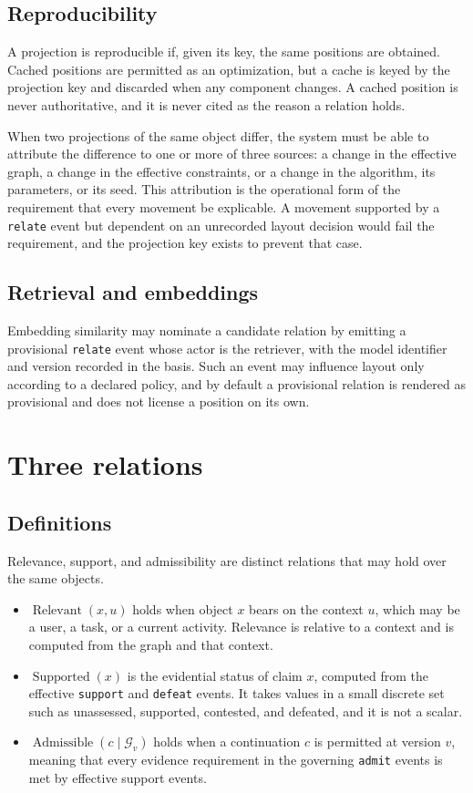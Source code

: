 \documentclass[11pt]{article}
\theoremstyle{definition}
\newcommand{\Graph}{\mathcal{G}}
\newcommand{\Rel}{\operatorname{Relevant}}
\newcommand{\Supp}{\operatorname{Supported}}
\newcommand{\Adm}{\operatorname{Admissible}}
\newcommand{\ev}[1]{\texttt{#1}}
\begin{document}
\subsection{Reproducibility}

A projection is reproducible if, given its key, the same positions are obtained. Cached positions are permitted as an optimization, but a cache is keyed by the projection key and discarded when any component changes. A cached position is never authoritative, and it is never cited as the reason a relation holds.

When two projections of the same object differ, the system must be able to attribute the difference to one or more of three sources: a change in the effective graph, a change in the effective constraints, or a change in the algorithm, its parameters, or its seed. This attribution is the operational form of the requirement that every movement be explicable. A movement supported by a \ev{relate} event but dependent on an unrecorded layout decision would fail the requirement, and the projection key exists to prevent that case.

\subsection{Retrieval and embeddings}

Embedding similarity may nominate a candidate relation by emitting a provisional \ev{relate} event whose actor is the retriever, with the model identifier and version recorded in the basis. Such an event may influence layout only according to a declared policy, and by default a provisional relation is rendered as provisional and does not license a position on its own.

\section{Three relations}

\subsection{Definitions}

Relevance, support, and admissibility are distinct relations that may hold over the same objects.

\begin{itemize}[leftmargin=1.5em]
\item $\Rel(x,u)$ holds when object $x$ bears on the context $u$, which may be a user, a task, or a current activity. Relevance is relative to a context and is computed from the graph and that context.
\item $\Supp(x)$ is the evidential status of claim $x$, computed from the effective \ev{support} and \ev{defeat} events. It takes values in a small discrete set such as unassessed, supported, contested, and defeated, and it is not a scalar.
\item $\Adm(c \mid \Graph_v)$ holds when a continuation $c$ is permitted at version $v$, meaning that every evidence requirement in the governing \ev{admit} events is met by effective support events.
\end{itemize}
\end{document}
